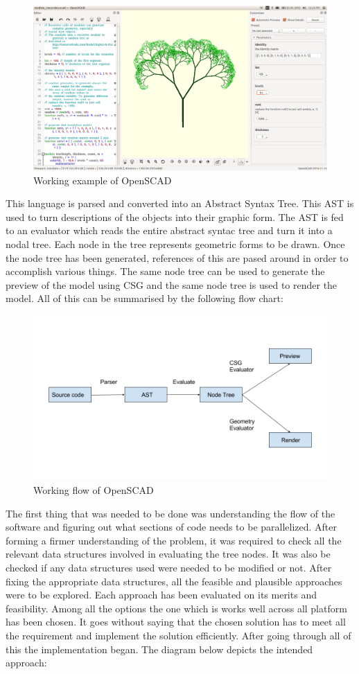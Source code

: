 \begin{figure}
    \centering \includegraphics[width=\linewidth]{images/output/5.png}
    \caption{Working example of OpenSCAD}
    \label{fig:1}
\end{figure}
This language is parsed and converted into an Abstract Syntax Tree. This AST is used to turn descriptions of the objects into their graphic form. The AST is fed to an evaluator which reads the entire abstract syntac tree and turn it into a nodal tree. Each node in the tree represents geometric forms to be drawn. Once the node tree has been generated, references of this are pased around in order to accomplish various things. The same node tree can be used to generate the preview of the model using CSG and the same node tree is used to render the model. All of this can be summarised by the following flow chart:
\begin{figure}
    \centering 
    \includegraphics[width=\linewidth]{images/flowchart.png}
    \caption{Working flow of OpenSCAD}
\end{figure}
The first thing that was needed to be done was understanding the flow of the software and figuring out what sections of code needs to be parallelized. After forming a firmer understanding of the problem, it was required to check all the relevant data structures involved in evaluating the tree nodes. It was also be checked if any data structures used were needed to be modified or not. After fixing the appropriate data structures, all the feasible and plausible approaches were to be explored. Each approach has been evaluated on its merits and feasibility. Among all the options the one which is works well across all platform has been chosen. It goes without saying that the chosen solution has to meet all the requirement and implement the solution efficiently. After going through all of this the implementation began. The diagram below depicts the intended approach:
